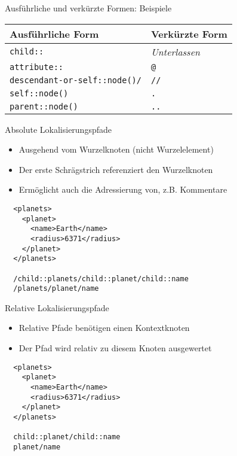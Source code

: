 \documentclass{beamer}
\begin{document}
\begin{frame}[fragile]{Ausführliche und verkürzte Formen: Beispiele}
	
	\centering
	\begin{tabular}{l|l}
		\hline
		Ausführliche Form & Verkürzte Form \\
		\hline
		\texttt{child::} & \emph{Unterlassen} \\
		\texttt{attribute::} & \texttt{@} \\
		\texttt{descendant-or-self::node()/} & \texttt{//} \\
		\texttt{self::node()} & \texttt{.} \\
		\texttt{parent::node()} & \texttt{..}  \\
		\hline
	\end{tabular}
	
\end{frame}

\begin{frame}[fragile]{Absolute Lokalisierungspfade}
	
	\begin{itemize}
		\item Ausgehend vom Wurzelknoten (nicht Wurzelelement)
		\item Der erste Schrägstrich referenziert den Wurzelknoten
		\item Ermöglicht auch die Adressierung von, z.B. Kommentare
	\end{itemize}
		
	\lstset{language=XML}
	\begin{lstlisting}	
  <planets>
    <planet>
      <name>Earth</name>
      <radius>6371</radius>
    </planet>
  </planets>

  /child::planets/child::planet/child::name
  /planets/planet/name
	\end{lstlisting}
	
\end{frame}

\begin{frame}[fragile]{Relative Lokalisierungspfade}
	
	\begin{itemize}
		\item Relative Pfade benötigen einen Kontextknoten
		\item Der Pfad wird relativ zu diesem Knoten ausgewertet
	\end{itemize}
	
	\lstset{language=XML}
	\begin{lstlisting}	
  <planets>
    <planet>
      <name>Earth</name>
      <radius>6371</radius>
    </planet>
  </planets>

  child::planet/child::name
  planet/name
	\end{lstlisting}
	
\end{frame}
\end{document}
